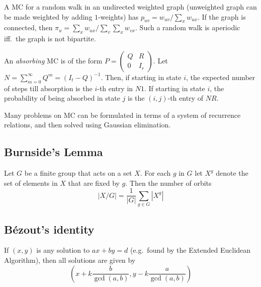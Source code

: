 \documentclass[9pt,a4paper,twocolumn,landscape,oneside]{amsart}
\begin{document}
        A MC for a random walk in an undirected weighted graph (unweighted
        graph can be made weighted by adding $1$-weights) has $p_{uv} =
        w_{uv}/\sum_{x} w_{ux}$. If the graph is connected, then $\pi_u =
        \sum_{x} w_{ux} / \sum_{v}\sum_{x} w_{vx}$. Such a random walk is
        aperiodic iff.\ the graph is not bipartite.

        An \textit{absorbing} MC is of the form $P = \left(\begin{matrix} Q & R
        \\ 0 & I_r \end{matrix}\right)$. Let $N = \sum_{m=0}^\infty Q^m = (I_t
        - Q)^{-1}$. Then, if starting in state $i$, the expected number of
        steps till absorption is the $i$-th entry in $N1$. If starting in state
        $i$, the probability of being absorbed in state $j$ is the $(i,j)$-th
        entry of $NR$.

        Many problems on MC can be formulated in terms of a system of
        recurrence relations, and then solved using Gaussian elimination.

    \subsection{Burnside's Lemma}
        Let $G$ be a finite group that acts on a set $X$. For each $g$ in $G$
        let $X^g$ denote the set of elements in $X$ that are fixed by $g$. Then
        the number of orbits \[ |X/G| = \frac{1}{|G|} \sum_{g\in G} |X^g| \]

    \subsection{Bézout's identity}
        If $(x,y)$ is any solution to $ax+by=d$ (e.g.\ found by the Extended
        Euclidean Algorithm), then all solutions are given by \[
        \left(x+k\frac{b}{\gcd(a,b)}, y-k\frac{a}{\gcd(a,b)}\right) \]
\end{document}
